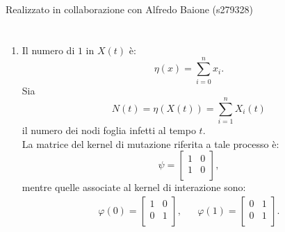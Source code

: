 \documentclass[11pt,largemargins]{homework}
\begin{document}
\maketitle
\begin{center}
Realizzato in collaborazione con Alfredo Baione (s279328)
\end{center}
\section{}%
  
    
  \begin{enumerate}
 
  
    \item
     Il numero di $1$ in $X(t)$ è:
     \begin{equation*}
     \eta\left(x\right)= \sum_{i=0}^{n}x_{i}.
     \end{equation*}
    Sia 
    \begin{equation*}
    N\left(t\right)=\eta\left(X\left(t\right)\right)=\sum_{i=1}^{n}X_{i}\left(t\right)
    \end{equation*}
     il numero dei nodi foglia infetti al tempo $t$.\\
     La matrice del kernel di mutazione riferita a tale processo è:
    \begin{equation*}
      \psi=
      \begin{bmatrix}
        1 & 0  \\
        1 & 0  \\
      \end{bmatrix},
      \end{equation*}
  mentre quelle associate al kernel di interazione sono:
   \begin{align*}
      \varphi\left(0\right)=\begin{bmatrix}
        1 & 0\\
        0 & 1 \\ 
      \end{bmatrix}, &&  
      \varphi\left(1\right)=\begin{bmatrix}
         0 & 1\\
        0 & 1 \\ 
      \end{bmatrix}.
    \end{align*}
    

\end{enumerate}
\end{document}
